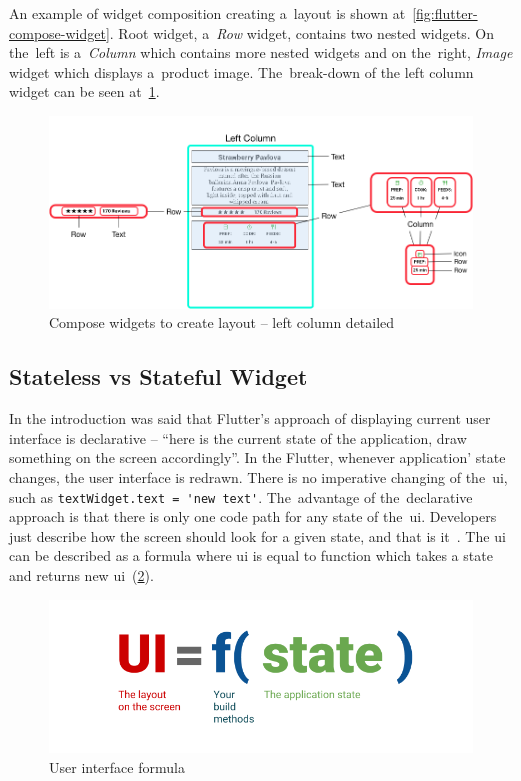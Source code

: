 An example of widget composition creating a~layout is shown at~\cref{fig:flutter-compose-widget}. Root widget, a~\textit{Row} widget, contains two nested widgets. On the~left is a~\textit{Column} which contains more nested widgets and on the~right, \textit{Image} widget which displays a~product image. The~break-down of the left column widget can be seen at~\cref{fig:flutter-compose-widget-detail}. 

\begin{figure}[htp]
    \centering
    \includegraphics[width=0.75\linewidth]{img/flutter/layout_compose_detail.png}
    \caption{Compose widgets to create layout -- left column detailed~\cite{flutter-widget-layout}}
    \label{fig:flutter-compose-widget-detail}
\end{figure}
\subsection{Stateless vs Stateful Widget}
In the introduction was said that Flutter's approach of displaying current user interface is declarative -- ``here is the current state of the application, draw something on the screen accordingly''.  In the Flutter, whenever application' state changes, the user interface is redrawn. There is no imperative changing of the~\gls{ui}, such as \verb|textWidget.text = 'new text'|. The~advantage of the~declarative approach is that there is only one code path for any state of the~\gls{ui}. Developers just describe how the screen should look for a given state, and that is it~\cite{flutter-declarative}. The \gls{ui} can be described as a formula where \gls{ui} is equal to function which takes a state and returns new \gls{ui}~(\cref{fig:flutter-ui-formula}).

\begin{figure}[htp]
    \centering
    \includegraphics[width=0.6\linewidth]{img/flutter/ui_f_state.png}
    \caption{User interface formula~\cite{flutter-declarative}}
    \label{fig:flutter-ui-formula}
\end{figure}
